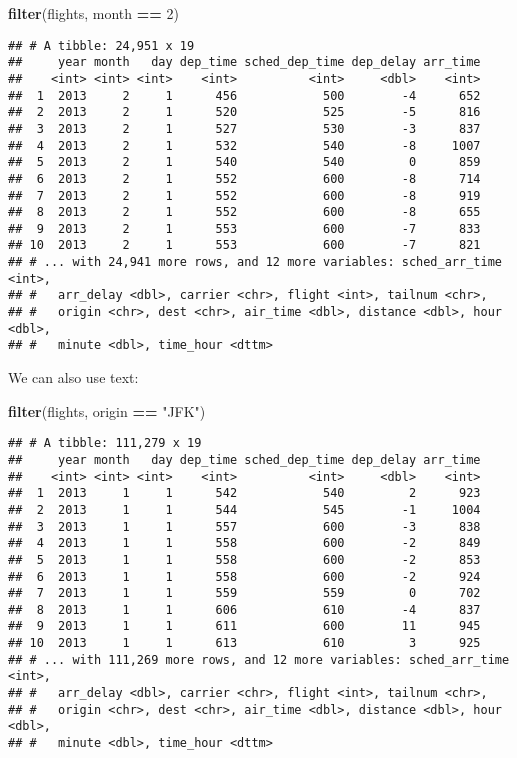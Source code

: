 \documentclass[]{book}
\newenvironment{Shaded}{\begin{snugshade}}{\end{snugshade}}
\newcommand{\DecValTok}[1]{\textcolor[rgb]{0.00,0.00,0.81}{#1}}
\newcommand{\KeywordTok}[1]{\textcolor[rgb]{0.13,0.29,0.53}{\textbf{#1}}}
\newcommand{\NormalTok}[1]{#1}
\newcommand{\OperatorTok}[1]{\textcolor[rgb]{0.81,0.36,0.00}{\textbf{#1}}}
\newcommand{\StringTok}[1]{\textcolor[rgb]{0.31,0.60,0.02}{#1}}
\begin{document}
\begin{Shaded}
\begin{Highlighting}[]
\KeywordTok{filter}\NormalTok{(flights, month }\OperatorTok{==}\StringTok{ }\DecValTok{2}\NormalTok{)}
\end{Highlighting}
\end{Shaded}

\begin{verbatim}
## # A tibble: 24,951 x 19
##     year month   day dep_time sched_dep_time dep_delay arr_time
##    <int> <int> <int>    <int>          <int>     <dbl>    <int>
##  1  2013     2     1      456            500        -4      652
##  2  2013     2     1      520            525        -5      816
##  3  2013     2     1      527            530        -3      837
##  4  2013     2     1      532            540        -8     1007
##  5  2013     2     1      540            540         0      859
##  6  2013     2     1      552            600        -8      714
##  7  2013     2     1      552            600        -8      919
##  8  2013     2     1      552            600        -8      655
##  9  2013     2     1      553            600        -7      833
## 10  2013     2     1      553            600        -7      821
## # ... with 24,941 more rows, and 12 more variables: sched_arr_time <int>,
## #   arr_delay <dbl>, carrier <chr>, flight <int>, tailnum <chr>,
## #   origin <chr>, dest <chr>, air_time <dbl>, distance <dbl>, hour <dbl>,
## #   minute <dbl>, time_hour <dttm>
\end{verbatim}

We can also use text:

\begin{Shaded}
\begin{Highlighting}[]
\KeywordTok{filter}\NormalTok{(flights, origin }\OperatorTok{==}\StringTok{ "JFK"}\NormalTok{)}
\end{Highlighting}
\end{Shaded}

\begin{verbatim}
## # A tibble: 111,279 x 19
##     year month   day dep_time sched_dep_time dep_delay arr_time
##    <int> <int> <int>    <int>          <int>     <dbl>    <int>
##  1  2013     1     1      542            540         2      923
##  2  2013     1     1      544            545        -1     1004
##  3  2013     1     1      557            600        -3      838
##  4  2013     1     1      558            600        -2      849
##  5  2013     1     1      558            600        -2      853
##  6  2013     1     1      558            600        -2      924
##  7  2013     1     1      559            559         0      702
##  8  2013     1     1      606            610        -4      837
##  9  2013     1     1      611            600        11      945
## 10  2013     1     1      613            610         3      925
## # ... with 111,269 more rows, and 12 more variables: sched_arr_time <int>,
## #   arr_delay <dbl>, carrier <chr>, flight <int>, tailnum <chr>,
## #   origin <chr>, dest <chr>, air_time <dbl>, distance <dbl>, hour <dbl>,
## #   minute <dbl>, time_hour <dttm>
\end{verbatim}
\end{document}
